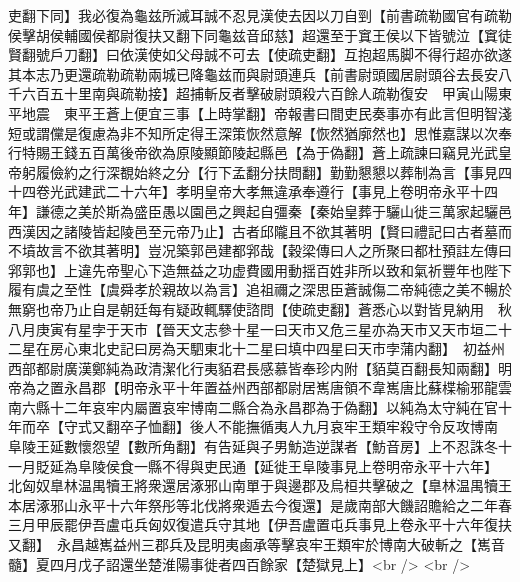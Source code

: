 吏翻下同】我必復為龜兹所滅耳誠不忍見漢使去因以刀自剄【前書疏勒國官有疏勒侯擊胡侯輔國侯都尉復扶又翻下同龜兹音邱慈】超還至于窴王侯以下皆號泣【窴徒賢翻號戶刀翻】曰依漢使如父母誠不可去【使疏吏翻】互抱超馬脚不得行超亦欲遂其本志乃更還疏勒疏勒兩城已降龜兹而與尉頭連兵【前書尉頭國居尉頭谷去長安八千六百五十里南與疏勒接】超捕斬反者擊破尉頭殺六百餘人疏勒復安　甲寅山陽東平地震　東平王蒼上便宜三事【上時掌翻】帝報書曰間吏民奏事亦有此言但明智淺短或謂儻是復慮為非不知所定得王深策恢然意解【恢然猶廓然也】思惟嘉謀以次奉行特賜王錢五百萬後帝欲為原陵顯節陵起縣邑【為于偽翻】蒼上疏諫曰竊見光武皇帝躬履儉約之行深覩始終之分【行下孟翻分扶問翻】勤勤懇懇以葬制為言【事見四十四卷光武建武二十六年】孝明皇帝大孝無違承奉遵行【事見上卷明帝永平十四年】謙德之美於斯為盛臣愚以園邑之興起自彊秦【秦始皇葬于驪山徙三萬家起驪邑西漢因之諸陵皆起陵邑至元帝乃止】古者邱隴且不欲其著明【賢曰禮記曰古者墓而不墳故言不欲其著明】豈况築郭邑建都郛哉【穀梁傳曰人之所聚曰都杜預註左傳曰郛郭也】上違先帝聖心下造無益之功虚費國用動揺百姓非所以致和氣祈豐年也陛下履有虞之至性【虞舜孝於親故以為言】追祖禰之深思臣蒼誠傷二帝純德之美不暢於無窮也帝乃止自是朝廷每有疑政輒驛使諮問【使疏吏翻】蒼悉心以對皆見納用　秋八月庚寅有星孛于天市【晉天文志參十星一曰天市又危三星亦為天市又天市垣二十二星在房心東北史記曰房為天駟東北十二星曰填中四星曰天市孛蒲内翻】　初益州西部都尉廣漢鄭純為政清潔化行夷貊君長感慕皆奉珍内附【貊莫百翻長知兩翻】明帝為之置永昌郡【明帝永平十年置益州西部都尉居嶲唐領不韋嶲唐比蘇楪榆邪龍雲南六縣十二年哀牢内屬置哀牢博南二縣合為永昌郡為于偽翻】以純為太守純在官十年而卒【守式又翻卒子恤翻】後人不能撫循夷人九月哀牢王類牢殺守令反攻博南　阜陵王延數懷怨望【數所角翻】有告延與子男魴造逆謀者【魴音房】上不忍誅冬十一月貶延為阜陵侯食一縣不得與吏民通【延徙王阜陵事見上卷明帝永平十六年】　北匈奴臯林温禺犢王將衆還居涿邪山南單于與邊郡及烏桓共擊破之【臯林温禺犢王本居涿邪山永平十六年祭彤等北伐將衆遁去今復還】是歲南部大饑詔贍給之二年春三月甲辰罷伊吾盧屯兵匈奴復遣兵守其地【伊吾盧置屯兵事見上卷永平十六年復扶又翻】　永昌越嶲益州三郡兵及昆明夷鹵承等擊哀牢王類牢於博南大破斬之【嶲音髓】夏四月戊子詔還坐楚淮陽事徙者四百餘家【楚獄見上】<br />
<br />
